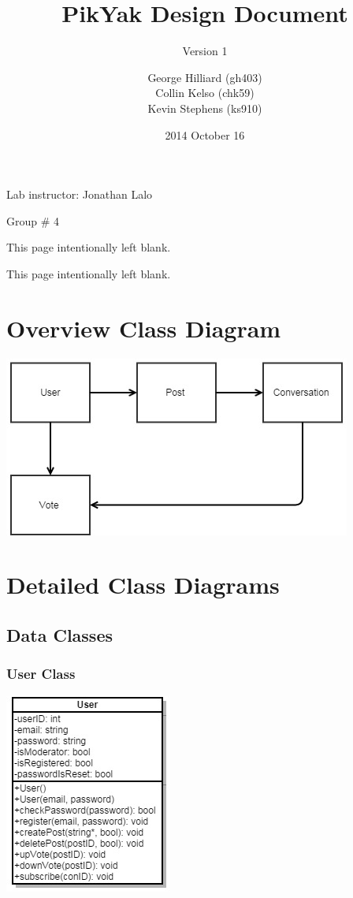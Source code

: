 \documentclass[11pt]{scrartcl}
\title{PikYak Design Document}
\subtitle{Version 1}
\author{
    George Hilliard (gh403) \\
    Collin Kelso (chk59) \\
    Kevin Stephens (ks910)
}
\date{2014 October 16}
\newcommand*{\blankpage}{%
\clearpage
\vspace*{\fill}
\centerline{This page intentionally left blank.}
\vspace{\fill}
\clearpage}
\let\stdsection\section
\renewcommand\section{\newpage\stdsection}
\begin{document}

\maketitle

\begin{center}
Lab instructor: Jonathan Lalo

Group \# 4
\end{center}

\blankpage

\tableofcontents

\blankpage


\section{Overview Class Diagram}

    \centerline{\includegraphics{diagrams/Overview-UML}}

\section{Detailed Class Diagrams}
    \subsection{Data Classes}
        \subsubsection{User Class}

            \centerline{\includegraphics{diagrams/user-UML}}
\end{document}
